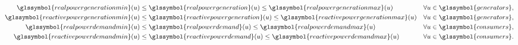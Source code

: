 \begin{align}
        \glssymbol{realpowergenerationmin}(\vertexa)
    &\leq
        \glssymbol{realpowergeneration}(\vertexa)
    \leq
        \glssymbol{realpowergenerationmax}(\vertexa) &
        \forall\vertexa\in\glssymbol{generators},
    \label{ch:foundations:sec:power-flow-analyses:eq:network:bounds:real-power-injection}
    \\
        \glssymbol{reactivepowergenerationmin}(\vertexa)
    &\leq
        \glssymbol{reactivepowergeneration}(\vertexa)
    \leq
        \glssymbol{reactivepowergenerationmax}(\vertexa) &
        \forall\vertexa\in\glssymbol{generators},
    \label{ch:foundations:sec:power-flow-analyses:eq:network:bounds:reactive-power-injection}
    \\
        \glssymbol{realpowerdemandmin}(\vertexa)
    &\leq
        \glssymbol{realpowerdemand}(\vertexa)
    \leq
        \glssymbol{realpowerdemandmax}(\vertexa)   & \forall\vertexa\in\glssymbol{consumers},
    \label{ch:foundations:sec:power-flow-analyses:eq:network:bounds:real-power-disturbance}
    \\
        \glssymbol{reactivepowerdemandmin}(\vertexa)
    &\leq
        \glssymbol{reactivepowerdemand}(\vertexa)
    \leq
        \glssymbol{reactivepowerdemandmax}(\vertexa)   &
        \forall\vertexa\in\glssymbol{consumers}.
    \label{ch:foundations:sec:power-flow-analyses:eq:network:bounds:reactive-power-disturbance}
\end{align}